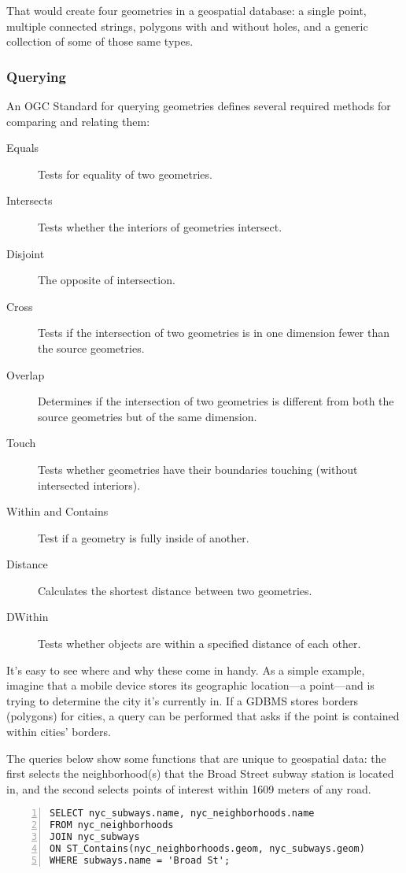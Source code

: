 That would create four geometries in a geospatial database: a single point, multiple connected strings, polygons with and without holes, and a generic collection of some of those same types.

\subsubsection{Querying}
An OGC Standard for querying geometries defines several required methods for comparing and relating them:

\begin{description}
  \item[Equals] Tests for equality of two geometries.
  \item[Intersects] Tests whether the interiors of geometries intersect.
  \item[Disjoint] The opposite of intersection.
  \item[Cross] Tests if the intersection of two geometries is in one dimension fewer than the source geometries.
  \item[Overlap] Determines if the intersection of two geometries is different from both the source geometries but of the same dimension.
  \item[Touch] Tests whether geometries have their boundaries touching (without intersected interiors).
  \item[Within and Contains] Test if a geometry is fully inside of another.
  \item[Distance] Calculates the shortest distance between two geometries.
  \item[DWithin] Tests whether objects are within a specified distance of each other.
\end{description}

It's easy to see where and why these come in handy. As a simple example, imagine that a mobile device stores its geographic location---a point---and is trying to determine the city it's currently in. If a GDBMS stores borders (polygons) for cities, a query can be performed that asks if the point is contained within cities' borders.

The queries below show some functions that are unique to geospatial data: the first selects the neighborhood(s) that the Broad Street subway station is located in, and the second selects points of interest within 1609 meters of any road.

\begin{Verbatim}[samepage=true,baselinestretch=1,numbers=left,xleftmargin=12mm]
SELECT nyc_subways.name, nyc_neighborhoods.name
FROM nyc_neighborhoods
JOIN nyc_subways
ON ST_Contains(nyc_neighborhoods.geom, nyc_subways.geom)
WHERE subways.name = 'Broad St';
\end{Verbatim}

